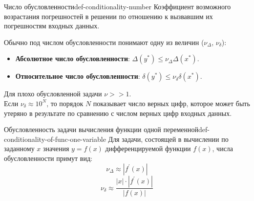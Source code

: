 \documentclass[14pt]{extarticle}
\begin{document}
    \begin{definition}{Число обусловленности}{def-conditionality-number}
        Коэффициент возможного возрастания погрешностей в решении по отношению к вызвавшим их погрешностям входных данных.
   
        \vspace{\baselineskip}
   
        Обычно под числом обусловленности понимают одну из величин ($\nu_{\Delta}$, $\nu_{\delta}$):
        \begin{itemize}
            \item \textbf{Абсолютное число обусловленности}: $\Delta(y^{*}) \leq \nu_{\Delta}\Delta(x^{*})$.
            \item \textbf{Относительное число обусловленности}: $\delta(y^{*}) \leq \nu_{\delta}\delta(x^{*})$.
        \end{itemize}
    \end{definition}

    Для плохо обусловленной задачи $\nu >> 1$.\\ 
    Если $\nu_{\delta} \approx 10^{N}$, то порядок $N$ показывает число верных цифр, которое может быть утеряно в результате по сравнению с числом верных цифр входных данных.

    \begin{definition}{Обусловленность задачи вычисления функции одной переменной}{def-conditionality-of-func-one-variable}
        Для задачи, состоящей в вычислении по заданному $x$ значения $y = f(x)$ дифференцируемой функции $f(x)$, числа обусловленности примут вид:
        $$\nu_{\Delta} \approx |f^{'}(x)|$$
        $$\nu_{\delta} \approx \frac{|x| \cdot |f^{'}(x)|}{|f(x)|}$$
    \end{definition}
\end{document}
